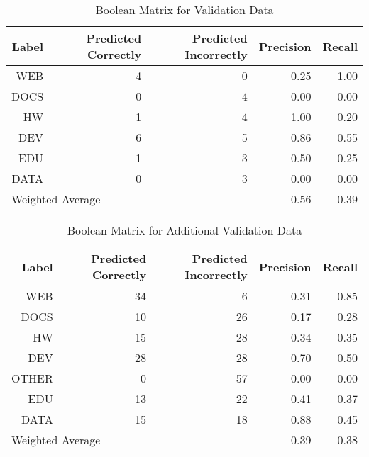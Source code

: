\begin{table}[h]
\centering
\caption{Boolean Matrix for Validation Data }
\label{boolean_matrix_commit_messages_validation}
\begin{tabular}{|r|r|r|r|r|}
 \hline
Label & Predicted Correctly & Predicted Incorrectly & Precision & Recall \\ \hline
WEB & 4 & 0 & 0.25 & 1.00 \\ \hline
DOCS & 0 & 4 & 0.00 & 0.00 \\ \hline
HW & 1 & 4 & 1.00 & 0.20 \\ \hline
DEV & 6 & 5 & 0.86 & 0.55 \\ \hline
EDU & 1 & 3 & 0.50 & 0.25 \\ \hline
DATA & 0 & 3 & 0.00 & 0.00 \\ \hline
\multicolumn{3}{|l|}{Weighted Average} & 0.56 & 0.39 \\ \hline
\end{tabular}
\end{table}

\begin{table}[h]
\centering
\caption{Boolean Matrix for Additional Validation Data}
\label{boolean_matrix_commit_messages_add_validation}
\begin{tabular}{|r|r|r|r|r|}
 \hline
Label & Predicted Correctly & Predicted Incorrectly & Precision & Recall \\ \hline
WEB & 34 & 6 & 0.31 & 0.85 \\ \hline
DOCS & 10 & 26 & 0.17 & 0.28 \\ \hline
HW & 15 & 28 & 0.34 & 0.35 \\ \hline
DEV & 28 & 28 & 0.70 & 0.50 \\ \hline
OTHER & 0 & 57 & 0.00 & 0.00 \\ \hline
EDU & 13 & 22 & 0.41 & 0.37 \\ \hline
DATA & 15 & 18 & 0.88 & 0.45 \\ \hline
\multicolumn{3}{|l|}{Weighted Average} & 0.39 & 0.38 \\ \hline
\end{tabular}
\end{table}